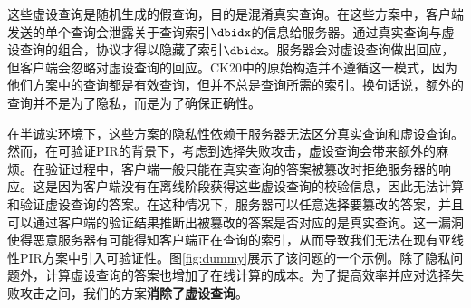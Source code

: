 这些虚设查询是随机生成的假查询，目的是混淆真实查询。在这些方案中，客户端发送的单个查询会泄露关于查询索引$\dbidx$的信息给服务器。通过真实查询与虚设查询的组合，协议才得以隐藏了索引$\dbidx$。服务器会对虚设查询做出回应，但客户端会忽略对虚设查询的回应。CK20中的原始构造\cite{EC:CorKog20}并不遵循这一模式，因为他们方案中的查询都是有效查询，但并不总是查询所需的索引。换句话说，额外的查询并不是为了隐私，而是为了确保正确性。

在半诚实环境下，这些方案的隐私性依赖于服务器无法区分真实查询和虚设查询。然而，在可验证PIR的背景下，考虑到选择失败攻击，虚设查询会带来额外的麻烦。在验证过程中，客户端一般只能在真实查询的答案被篡改时拒绝服务器的响应。这是因为客户端没有在离线阶段获得这些虚设查询的校验信息，因此无法计算和验证虚设查询的答案。在这种情况下，服务器可以任意选择要篡改的答案，并且可以通过客户端的验证结果推断出被篡改的答案是否对应的是真实查询。这一漏洞使得恶意服务器有可能得知客户端正在查询的索引，从而导致我们无法在现有亚线性PIR方案中引入可验证性。图\ref{fig:dummy}展示了该问题的一个示例。除了隐私问题外，计算虚设查询的答案也增加了在线计算的成本。为了提高效率并应对选择失败攻击之间，我们的方案\textbf{消除了虚设查询}。

